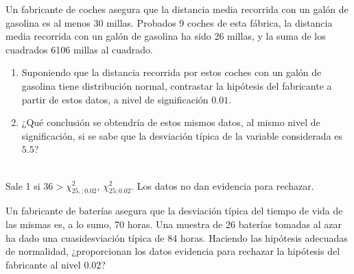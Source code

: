 \begin{ejercicio}%
    Un fabricante de coches asegura que la distancia media recorrida con un galón de gasolina es al menos 30 millas. Probados 9 coches de esta fábrica, la distancia media recorrida con un galón de gasolina ha sido 26 millas, y la suma de los cuadrados 6106 millas al cuadrado.
    \begin{enumerate}[label=\alph*)]
        \item Suponiendo que la distancia recorrida por estos coches con un galón de gasolina tiene distribución normal, contrastar la hipótesis del fabricante a partir de estos datos, a nivel de significación $0.01$.
        \item ¿Qué conclusión se obtendría de estos mismos datos, al mismo nivel de significación, si se sabe que la desviación típica de la variable considerada es $5.5$?
    \end{enumerate}~\\

    \noindent
    Sale 1 si $36  > \chi^2_{25,;0.02}$, $\chi^2_{25;0.02}$. Los datos no dan evidencia para rechazar.
\end{ejercicio}

\begin{ejercicio}%
    Un fabricante de baterías asegura que la desviación típica del tiempo de vida de las mismas es, a lo sumo, 70 horas. Una muestra de 26 baterías tomadas al azar ha dado una cuasidesviación típica de 84 horas. Haciendo las hipótesis adecuadas de normalidad, ¿proporcionan los datos evidencia para rechazar la hipótesis del fabricante al nivel $0.02$?
\end{ejercicio}

